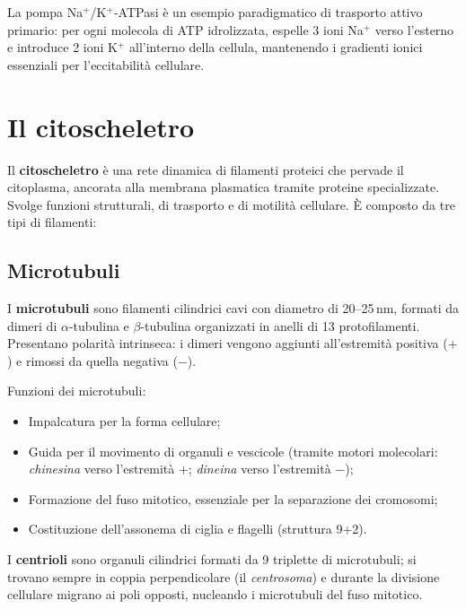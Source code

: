 \documentclass[11pt,a4paper,openright,twoside]{book}
\theoremstyle{definition}
\theoremstyle{plain}
\theoremstyle{remark}
\begin{document}
\begin{tcolorbox}[exbox, title={Pompa sodio-potassio}]
  La pompa Na$^+$/K$^+$-ATPasi è un esempio paradigmatico di trasporto attivo primario: per ogni molecola di ATP idrolizzata, espelle 3 ioni Na$^+$ verso l'esterno e introduce 2 ioni K$^+$ all'interno della cellula, mantenendo i gradienti ionici essenziali per l'eccitabilità cellulare.
\end{tcolorbox}

\section{Il citoscheletro}

Il \textbf{citoscheletro} è una rete dinamica di filamenti proteici che pervade il citoplasma, ancorata alla membrana plasmatica tramite proteine specializzate. Svolge funzioni strutturali, di trasporto e di motilità cellulare. È composto da tre tipi di filamenti:

\subsection{Microtubuli}

I \textbf{microtubuli} sono filamenti cilindrici cavi con diametro di 20--25\,nm, formati da dimeri di $\alpha$-tubulina e $\beta$-tubulina organizzati in anelli di 13 protofilamenti. Presentano polarità intrinseca: i dimeri vengono aggiunti all'estremità positiva ($+$) e rimossi da quella negativa ($-$).

Funzioni dei microtubuli:
\begin{itemize}
  \item Impalcatura per la forma cellulare;
  \item Guida per il movimento di organuli e vescicole (tramite motori molecolari: \textit{chinesina} verso l'estremità $+$; \textit{dineina} verso l'estremità $-$);
  \item Formazione del fuso mitotico, essenziale per la separazione dei cromosomi;
  \item Costituzione dell'assonema di ciglia e flagelli (struttura 9+2).
\end{itemize}

I \textbf{centrioli} sono organuli cilindrici formati da 9 triplette di microtubuli; si trovano sempre in coppia perpendicolare (il \textit{centrosoma}) e durante la divisione cellulare migrano ai poli opposti, nucleando i microtubuli del fuso mitotico.
\end{document}
